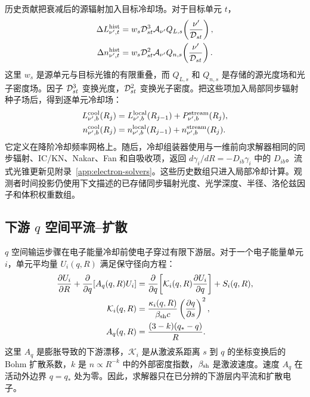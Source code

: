 \documentclass[twocolumn]{aastex702}
\begin{document}
历史贡献把衰减后的源辐射加入目标冷却场。对于目标单元 \(t\)，
\begin{equation}
\begin{aligned}
\Delta L_{\nu',t}^{\rm hist}
&=w_s{\cal D}_{st}^3
{\cal A}_{\nu'} Q_{L,s}\!\left(\frac{\nu'}{{\cal D}_{st}}\right),\\
\Delta n_{\nu',t}^{\rm hist}
&=w_s{\cal D}_{st}^2
{\cal A}_{\nu'} Q_{n,s}\!\left(\frac{\nu'}{{\cal D}_{st}}\right).
\end{aligned}
\end{equation}
这里 \(w_s\) 是源单元与目标光锥的有限重叠，而 \(Q_{L,s}\) 和 \(Q_{n,s}\) 是存储的源光度场和光子密度场。因子 \({\cal D}_{st}^3\) 变换光度，\({\cal D}_{st}^2\) 变换光子密度。把这些项加入局部同步辐射种子场后，得到逐单元冷却场：
\begin{equation}
\begin{aligned}
L_{\nu',b}^{\rm cool}(R_j)
&=L_{\nu',b}^{\rm local}(R_{j-1})
+P_{\nu',b}^{\rm stream}(R_j),\\
n_{\nu',b}^{\rm cool}(R_j)
&=n_{\nu',b}^{\rm local}(R_{j-1})
+n_{\nu',b}^{\rm stream}(R_j).
\end{aligned}
\end{equation}
它定义在降阶冷却频率网格上。随后，冷却组装器使用与一维前向求解器相同的同步辐射、IC/KN、Nakar、Fan 和自吸收项，返回 \(d\gamma_i/dR=-D_{ib}\gamma_i\) 中的 \(D_{ib}\)。流式光锥更新见附录~\ref{app:electron-solvers}。这些历史数组只进入局部冷却计算。观测者时间投影仍使用下文描述的已存储同步辐射光度、光学深度、半径、洛伦兹因子和体积权重数组。

\subsection{下游 \texorpdfstring{\(q\)}{q} 空间平流--扩散}

\(q\) 空间输运步骤在电子能量冷却前使电子穿过有限下游层。对于一个电子能量单元 \(i\)，单元平均量 \(U_i(q,R)\) 满足保守径向方程：
\begin{equation}
\begin{aligned}
\frac{\partial U_i}{\partial R}
+\frac{\partial}{\partial q}\!\left[A_q(q,R)U_i\right]
&=
\frac{\partial}{\partial q}\!\left[
\mathcal K_i(q,R)\frac{\partial U_i}{\partial q}
\right]
+S_i(q,R),\\
\mathcal K_i(q,R)
&=\frac{\kappa_i(q,R)}{\beta_{\rm sh}c}
\left(\frac{\partial q}{\partial s}\right)^2,\\
A_q(q,R)&=\frac{(3-k)(q_\ast-q)}{R}.
\end{aligned}
\end{equation}
这里 \(A_q\) 是膨胀导致的下游漂移，\(\mathcal K_i\) 是从激波系距离 \(s\) 到 \(q\) 的坐标变换后的 Bohm 扩散系数，\(k\) 是 \(n\propto R^{-k}\) 中的外部密度指数，\(\beta_{\rm sh}\) 是激波速度。速度 \(A_q\) 在活动外边界 \(q=q_\ast\) 处为零。因此，求解器只在已分辨的下游层内平流和扩散电子。
\end{document}
